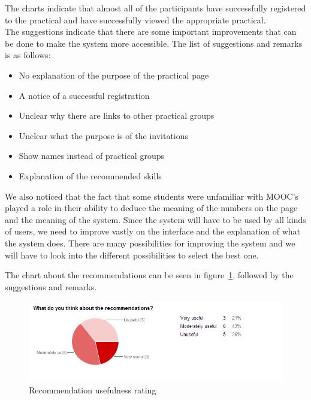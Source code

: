The charts indicate that almost all of the participants have successfully registered to the practical and have successfully viewed the appropriate practical.\\

The suggestions indicate that there are some important improvements that can be done to make the system more accessible.
The list of suggestions and remarks is as follows:
\begin{itemize}
\item No explanation of the purpose of the practical page
\item A notice of a successful registration
\item Unclear why there are links to other practical groups
\item Unclear what the purpose is of the invitations
\item Show names instead of practical groups
\item Explanation of the recommended skills
\end{itemize}

We also noticed that the fact that some students were unfamiliar with MOOC's played a role in their ability to deduce the meaning of the numbers on the page and the meaning of the system.
Since the system will have to be used by all kinds of users, we need to improve vastly on the interface and the explanation of what the system does.
There are many possibilities for improving the system and we will have to look into the different possibilities to select the best one.

The chart about the recommendations can be seen in figure~\ref{recommendations_chart}, followed by the suggestions and remarks.\\
\begin{figure}[H]
    \centering
    \includegraphics[width=\textwidth]{images/recommendations_chart}
    \caption{Recommendation usefulness rating}
    \label{recommendations_chart}
\end{figure}

